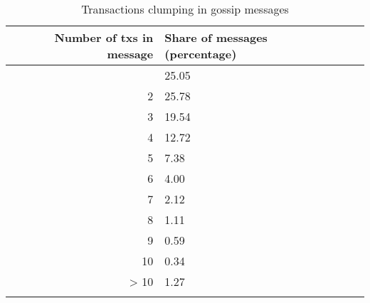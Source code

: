 \begin{longtable}{Rp{2.25cm}Rp{3cm}}
\caption{
{\large Transactions clumping in gossip messages}
} \\ 
\toprule
Number of txs in message & Share of messages (percentage) \\ 
\midrule{} & 25.05 \\ 
2 & 25.78 \\ 
3 & 19.54 \\ 
4 & 12.72 \\ 
5 & 7.38 \\ 
6 & 4.00 \\ 
7 & 2.12 \\ 
8 & 1.11 \\ 
9 & 0.59 \\ 
10 & 0.34 \\ 
> 10 & 1.27 \\ 
\bottomrule
\label{table-tx-clumping-p2p}
\end{longtable}
